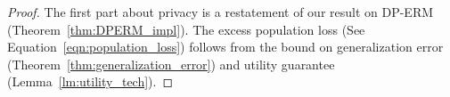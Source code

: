 \begin{proof}
The first part about privacy is a restatement of our result on DP-ERM (Theorem~\ref{thm:DPERM_impl}).
The excess population loss (See Equation~\eqref{eqn:population_loss}) follows from the bound on generalization error (Theorem~\ref{thm:generalization_error}) and utility guarantee (Lemma~\ref{lm:utility_tech}).
\end{proof}
\begin{comment}

===================\textcolor{red}{OLD TEXT BEGIN}===========================================
\begin{lemma}[Lemma 7 in \cite{BE02}]
\label{lm:generalization_error_erm}
For any learning algorithm $\cA$ and neighboring data-sets $\cD=\{s_1,\cdots,s_n\}$, $\cD^i=\{s_1,\cdots,s_{i-1},s_i',s_{i+1},\cdots,s_n\}$ drawn i.i.d from the underlying distribution $\cP$, let $\cA(\cD)$ be the output of $\cA$ with $\cD$. 
One has
\begin{align*}
    \E_{\cD}[\HF(\cA(\cD))-F(\cA(\cD);\cD)]=\E_{\cD,s_i'\sim\cP}\Big[\E[f(\cA(\cD);s_i')-f(\cA(\cD^{i});s_i')] \Big].
\end{align*}
\end{lemma}

Now we begin to state and prove our main result on the generalization error.
\begin{theorem}
\label{thm:generalization_error}
Suppose $\{f(\cdot,s)\}$ is a family of $G$-Lipschitz and $\mu$-strongly convex functions over $\cK$.
For any $k>0$ and suppose the $n$ samples $\cD=\{s_1,s_2,\cdots,s_n\}$ are drawn i.i.d from the underlying distribution $\cP$, then if we draw a sample $x^{(sol)}$ from density $\propto e^{-kF(x;\cD)}$, we have
\begin{align*}
    \E[\HF(x^{(sol)})]-\min_{x\in\cK}\HF(x)\leq \frac{2G^2}{\mu n}+ \frac{d}{k}.
\end{align*}
\end{theorem}

\begin{proof}
Recall that $\cD=\{s_1,\cdots,s_n\}$.
\begin{align*}
    F(x;\cD)=\frac{1}{n}\sum_{s_i\in\cD}f(x;s_i).
\end{align*}
We consider any neighboring data set $\cD^i=\{s_1,\cdots,s_{i-1},s_i',s_{i+1},\cdots,s_n\}$.

Let $\pi\propto e^{-kF(x;\cD)}$ and $\hat{\pi}\propto \exp^{-kF(x;\cD^i)}$.
By the assumptions, we know both $F(x;\cD)$ and $F(x;\cD^i)$ are $\mu$-strongly convex and by Theorem~\ref{thm:TTI}, we have
\begin{align*}
    \mathrm{W}_2(\pi,\hpi)\leq \sqrt{\frac{2}{k\mu}\mathrm{D}_{KL}(\pi,\hpi)}.
\end{align*}


\end{comment}
